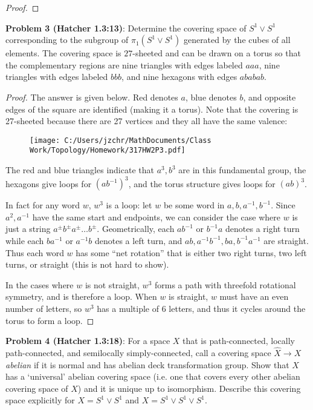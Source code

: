 \documentclass{amsart}
\begin{document}
\begin{proof}
\end{proof}

\newpage

\noindent \textbf{Problem 3 (Hatcher 1.3:13)}: Determine the covering space of $S^1\vee S^1$ corresponding to the subgroup of $\pi_1(S^1\vee S^1)$ generated by the cubes of all elements. The covering space is $27$-sheeted and can be drawn on a torus so that the complementary regions are nine triangles with edges labeled $aaa$, nine triangles with edges labeled $bbb$, and nine hexagons with edges $ababab$.

\begin{proof}

The answer is given below. Red denotes $a$, blue denotes $b$, and opposite edges of the square are identified (making it a torus). Note that the covering is 27-sheeted because there are 27 vertices and they all have the same valence:

\begin{figure}[h]
\texttt{[image: C:/Users/jzchr/MathDocuments/Class Work/Topology/Homework/317HW2P3.pdf]}
\end{figure}

The red and blue triangles indicate that $a^3,b^3$ are in this fundamental group, the hexagons give loops for $(ab^{-1})^3$, and the torus structure gives loops for $(ab)^3$.

In fact for any word $w$, $w^3$ is a loop: let $w$ be some word in $a,b,a^{-1},b^{-1}$. Since $a^2,a^{-1}$ have the same start and endpoints, we can consider the case where $w$ is just a string $a^{\pm}b^{\pm}a^{\pm}\dots b^{\pm}$. Geometrically, each $ab^{-1}$ or $b^{-1}a$ denotes a right turn while each $ba^{-1}$ or $a^{-1}b$ denotes a left turn, and $ab,a^{-1}b^{-1},ba,b^{-1}a^{-1}$ are straight. Thus each word $w$ has some ``net rotation'' that is either two right turns, two left turns, or straight (this is not hard to show). 

In the cases where $w$ is not straight, $w^3$ forms a path with threefold rotational symmetry, and is therefore a loop. When $w$ is straight, $w$ must have an even number of letters, so $w^3$ has a multiple of 6 letters, and thus it cycles around the torus to form a loop.
\end{proof}

\newpage 

\noindent \textbf{Problem 4 (Hatcher 1.3:18)}: For a space $X$ that is path-connected, locally path-connected, and semilocally simply-connected, call a covering space $\hat{X}\to X$ \textit{abelian} if it is normal and has abelian deck transformation group. Show that $X$ has a `universal' abelian covering space (i.e. one that covers every other abelian covering space of $X$) and it is unique up to isomorphism. Describe this covering space explicitly for $X=S^1\vee S^1$ and $X=S^1\vee S^1 \vee S^1$.
\end{document}
